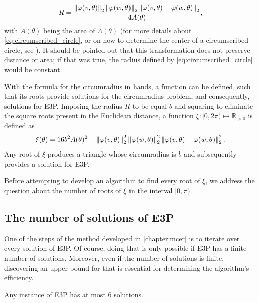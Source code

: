 \begin{equation}\label{eq:circumscribed_circle}
R = \dfrac{\left\lVert\varphi(v, \theta)\right\rVert_{2}\left\lVert\varphi(w, \theta)\right\rVert_{2}\left\lVert\varphi(v, \theta)-\varphi(w, \theta)\right\rVert_{2}   }{4A(\theta)},
\end{equation}
with $A(\theta)$ being the area of $\Lambda(\theta)$ (for more details about \autoref{eq:circumscribed_circle}, or on how to determine the center of a circumscribed circle, see ). It should be pointed out that this transformation does not preserve distance or area; if that was true, the radius defined by \autoref{eq:circumscribed_circle} would be constant.

With the formula for the circumradius in hands, a function can be defined, such that its roots provide solutions for the circumradius problem, and consequently, solutions for E3P.
Imposing the radius $R$ to be equal $b$ and squaring to eliminate the square roots present in the Euclidean distance, a function $\xi : [0, 2\pi) \mapsto \mathbb{R}_{>0}$ is defined as 
\begin{equation}\label{eq:circumscribed_circle_b}
\xi(\theta) = 16b^2A(\theta)^2 - \left\lVert\varphi(v, \theta)\right\rVert_{2}^2\left\lVert\varphi(w, \theta)\right\rVert_{2}^2\left\lVert\varphi(v, \theta)-\varphi(w, \theta)\right\rVert_{2}^2.
\end{equation}
Any root of $\xi$ produces a triangle whose circumradius is $b$ and subsequently provides a solution for E3P. 

Before attempting to develop an algorithm to find every root of $\xi$, we address the question about the number of roots of $\xi$ in the interval $[0, \pi)$.

\subsection{The number of solutions of E3P}

One of the steps of the method developed in \autoref{chapter:mcer} is to iterate over every solution of E3P. Of course, doing that is only possible if E3P has a finite number of solutions. Moreover, even if the number of solutions is finite, discovering an upper-bound for that is essential for determining the algorithm's efficiency.

\begin{lema}\label{lema:e3p}
	Any instance of E3P has at most $6$ solutions.
\end{lema}

